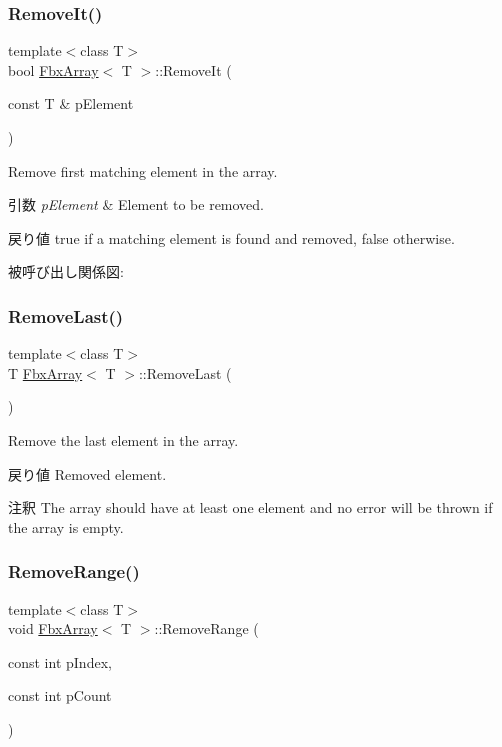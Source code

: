 \subsubsection{\texorpdfstring{Remove\+It()}{RemoveIt()}}
{\footnotesize\ttfamily template$<$class T$>$ \\
bool \hyperlink{class_fbx_array}{Fbx\+Array}$<$ T $>$\+::Remove\+It (\begin{DoxyParamCaption}\item[{const T \&}]{p\+Element }\end{DoxyParamCaption})}

Remove first matching element in the array. 
\begin{DoxyParams}{引数}
{\em p\+Element} & Element to be removed. \\
\hline
\end{DoxyParams}
\begin{DoxyReturn}{戻り値}
{\ttfamily true} if a matching element is found and removed, {\ttfamily false} otherwise. 
\end{DoxyReturn}
被呼び出し関係図\+:
\mbox{\label{class_fbx_array_ac346e868cc4a37ea1c292bdd9c3eca2e}} 
\subsubsection{\texorpdfstring{Remove\+Last()}{RemoveLast()}}
{\footnotesize\ttfamily template$<$class T$>$ \\
T \hyperlink{class_fbx_array}{Fbx\+Array}$<$ T $>$\+::Remove\+Last (\begin{DoxyParamCaption}{ }\end{DoxyParamCaption})}

Remove the last element in the array. \begin{DoxyReturn}{戻り値}
Removed element. 
\end{DoxyReturn}
\begin{DoxyRemark}{注釈}
The array should have at least one element and no error will be thrown if the array is empty. 
\end{DoxyRemark}
\mbox{\label{class_fbx_array_a63331ed053272acd6262f374f535f170}} 
\subsubsection{\texorpdfstring{Remove\+Range()}{RemoveRange()}}
{\footnotesize\ttfamily template$<$class T$>$ \\
void \hyperlink{class_fbx_array}{Fbx\+Array}$<$ T $>$\+::Remove\+Range (\begin{DoxyParamCaption}\item[{const int}]{p\+Index,  }\item[{const int}]{p\+Count }\end{DoxyParamCaption})}

